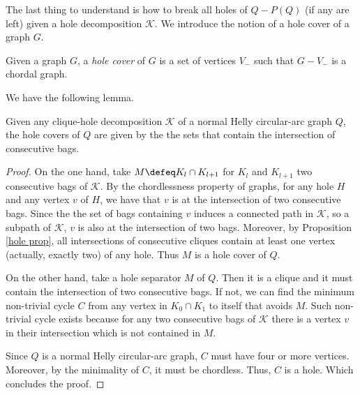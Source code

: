 \documentclass{article}
\begin{document}
    The last thing to
    understand is how to break
    all holes of $Q - P\left(Q\right)$
    (if any are left)
    given a hole decomposition $\mathcal{K}$.
    We introduce the notion of a
    hole cover of a graph $G$. 

    \begin{defn}
        Given a graph $G$,
        a \emph{hole cover} of
        $G$ is a set of vertices $V_{-}$ 
        such that $G - V_{-}$ is a
        chordal graph.
    \end{defn}

    We have the following lemma.
    
    \begin{lemma}
        Given any clique-hole decomposition
        $\mathcal{K}$ of a normal Helly
        circular-arc graph $Q$, the hole
        covers of $Q$ are given by the
        the sets that contain the intersection
        of consecutive bags.
    \end{lemma}
    \begin{proof}
        On the one hand, take $M \defeq K_{l} \cap K_{l+1}$ 
        for $K_{l}$ and $K_{l+1}$ two consecutive
        bags of $\mathcal{K}$. 
        By the chordlessness property
        of graphs, for any hole $H$ and
        any vertex $v$ of $H$, we have
        that 
        $v$ is at the intersection of
        two consecutive bags.
        Since the the set of bags
        containing $v$ induces a
        connected path in $\mathcal{K}$,
        so a subpath of $\mathcal{K}$,
        $v$ is also at the
        intersection of two bags.
        Moreover,
        by Proposition \ref{hole prop},
        all intersections of consecutive
        cliques contain at least one vertex
        (actually, exactly two) of
        any hole.
        Thus $M$ is a hole cover of $Q$.

        On the other hand, take a hole separator
        $M$ of $Q$. Then it is a
        clique and it must contain
        the intersection of two consecutive bags.
        If not, we can find the minimum non-trivial
        cycle $C$ from any vertex in $K_0 \cap K_1$
        to itself that avoids $M$. Such non-trivial
        cycle exists because for any two consecutive
        bags of $\mathcal{K}$ there is a vertex $v$ 
        in their intersection which is not 
        contained in $M$.

        Since $Q$ is a normal Helly circular-arc
        graph, $C$ must have four or more vertices.
        Moreover, by the minimality of $C$, it must be chordless.
        Thus, $C$ is a hole.
        Which concludes the proof.
    \end{proof}
    
\end{document}
